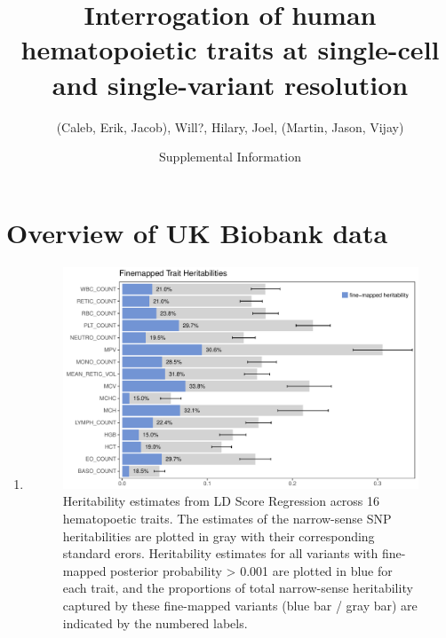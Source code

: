 \documentclass{article}\usepackage[]{graphicx}\usepackage[]{color}
\title{Interrogation of human hematopoietic traits at single-cell and single-variant resolution}
\date{Supplemental Information}
\author{(Caleb, Erik, Jacob), Will?, Hilary, Joel, (Martin, Jason, Vijay)}
\makeatletter
\def\maxwidth{ %
  \ifdim\Gin@nat@width>\linewidth
    \linewidth
  \else
    \Gin@nat@width
  \fi
}
\newenvironment{knitrout}{}{} %
\makeatother
\begin{document}
\maketitle
\section*{Overview of UK Biobank data}
\begin{enumerate}[label=(\Alph*)]
\item 



\begin{knitrout}
\color{fgcolor}\begin{figure}[H]

{\centering \includegraphics[width=\maxwidth]{figure/heritabilityPlots-1} 

}

\caption[Heritability estimates from LD Score Regression across 16 hematopoetic traits]{Heritability estimates from LD Score Regression across 16 hematopoetic traits. The estimates of the narrow-sense SNP heritabilities are plotted in gray with their corresponding standard erors. Heritability estimates for all variants with fine-mapped posterior probability > 0.001 are plotted in blue for each trait, and the proportions of total narrow-sense heritability captured by these fine-mapped variants (blue bar / gray bar) are indicated by the numbered labels.}\label{fig:heritabilityPlots}
\end{figure}


\end{knitrout}

\begin{knitrout}
\color{fgcolor}\begin{figure}[H]


\end{figure}
\end{knitrout}
\end{enumerate}
\end{document}
